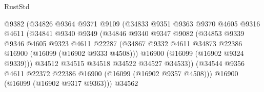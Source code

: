 \begin{lexlean}{RustStd}
\begin{coremodule}
                                    @9382
                                    (@34826
                                      @9364
                                      @9371
                                      @9109
                                      (@34833
                                        @9351
                                        @9363
                                        @9370
                                        @4605
                                        @9316
                                        @4611
                                        (@34841
                                          @9340
                                          @9349
                                          (@34846
                                            @9340
                                            @9347
                                            @9082
                                            (@34853
                                              @9339
                                              @9346
                                              @4605
                                              @9323
                                              @4611
                                              @22287
                                              (@34867
                                                @9332
                                                @4611
                                                @34873
                                                @22386
                                                @16900
                                                (@16099 (@16902 @9333 @4508)))
                                              @16900
                                              (@16099 (@16902 @9324 @9339)))
                                            @34512
                                            @34515
                                            @34518
                                            @34522
                                            @34527
                                            @34533))
                                        (@34544
                                          @9356
                                          @4611
                                          @22372
                                          @22386
                                          @16900
                                          (@16099 (@16902 @9357 @4508)))
                                        @16900
                                        (@16099 (@16902 @9317 @9363)))
                                      @34562

\end{coremodule}
\end{lexlean}

